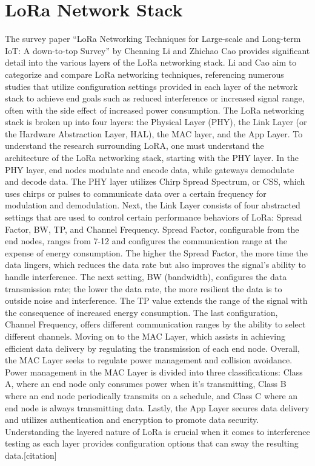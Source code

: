\documentclass[sigsmall]{acmart}
\begin{document}
\section*{LoRa Network Stack}
The survey paper “LoRa Networking Techniques for Large-scale and Long-term IoT: A down-to-top Survey” by Chenning Li and Zhichao Cao provides significant detail into the various layers of the LoRa networking stack. Li and Cao aim to categorize and compare LoRa networking techniques, referencing numerous studies that utilize configuration settings provided in each layer of the network stack to achieve end goals such as reduced interference or increased signal range, often with the side effect of increased power consumption. The LoRa networking stack is broken up into four layers: the Physical Layer (PHY), the Link Layer (or the Hardware Abstraction Layer, HAL), the MAC layer, and the App Layer.  To understand the research surrounding LoRA, one must understand the architecture of the LoRa networking stack, starting with the PHY layer.  In the PHY layer, end nodes modulate and encode data, while gateways demodulate and decode data. The PHY layer utilizes Chirp Spread Spectrum, or CSS, which uses chirps or pulses to communicate data over a certain frequency for modulation and demodulation. Next, the Link Layer consists of four abstracted settings that are used to control certain performance behaviors of LoRa: Spread Factor, BW, TP, and Channel Frequency. Spread Factor, configurable from the end nodes, ranges from 7-12 and configures the communication range at the expense of energy consumption. The higher the Spread Factor, the more time the data lingers, which reduces the data rate but also improves the signal's ability to handle interference. The next setting, BW (bandwidth), configures the data transmission rate; the lower the data rate, the more resilient the data is to outside noise and interference. The TP value extends the range of the signal with the consequence of increased energy consumption. The last configuration, Channel Frequency, offers different communication ranges by the ability to select different channels. Moving on to the MAC Layer, which assists in achieving efficient data delivery by regulating the transmission of each end node. Overall, the MAC Layer seeks to regulate power management and collision avoidance. Power management in the MAC Layer is divided into three classifications: Class A, where an end node only consumes power when it’s transmitting, Class B where an end node periodically transmits on a schedule, and Class C where an end node is always transmitting data. Lastly, the App Layer secures data delivery and utilizes authentication and encryption to promote data security. Understanding the layered nature of LoRa is crucial when it comes to interference testing as each layer provides configuration options that can sway the resulting data.[citation]
\end{document}
